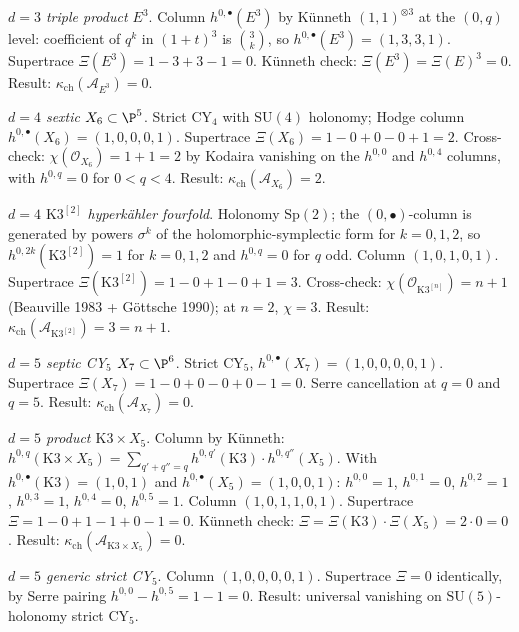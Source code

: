 \emph{$d = 3$ triple product $E^3$}. Column $h^{0, \bullet}(E^3)$ by
K\"unneth $(1, 1)^{\otimes 3}$ at the $(0, q)$ level: coefficient of
$q^k$ in $(1 + t)^3$ is $\binom{3}{k}$, so
$h^{0, \bullet}(E^3) = (1, 3, 3, 1)$. Supertrace $\Xi(E^3) = 1 - 3
+ 3 - 1 = 0$. K\"unneth check: $\Xi(E^3) = \Xi(E)^3 = 0$. Result:
$\kappa_{\mathrm{ch}}(\mathcal{A}_{E^3}) = 0$.

\emph{$d = 4$ sextic $X_6 \subset \P^5$}. Strict CY$_4$ with
$\mathrm{SU}(4)$ holonomy; Hodge column
$h^{0, \bullet}(X_6) = (1, 0, 0, 0, 1)$. Supertrace
$\Xi(X_6) = 1 - 0 + 0 - 0 + 1 = 2$. Cross-check:
$\chi(\mathcal{O}_{X_6}) = 1 + 1 = 2$ by Kodaira vanishing on the
$h^{0, 0}$ and $h^{0, 4}$ columns, with $h^{0, q} = 0$ for
$0 < q < 4$. Result: $\kappa_{\mathrm{ch}}(\mathcal{A}_{X_6}) = 2$.

\emph{$d = 4$ $\mathrm{K3}^{[2]}$ hyperk\"ahler fourfold}. Holonomy
$\mathrm{Sp}(2)$; the $(0, \bullet)$-column is generated by powers
$\sigma^k$ of the holomorphic-symplectic form for $k = 0, 1, 2$, so
$h^{0, 2k}(\mathrm{K3}^{[2]}) = 1$ for $k = 0, 1, 2$ and
$h^{0, q} = 0$ for $q$ odd. Column $(1, 0, 1, 0, 1)$. Supertrace
$\Xi(\mathrm{K3}^{[2]}) = 1 - 0 + 1 - 0 + 1 = 3$. Cross-check:
$\chi(\mathcal{O}_{\mathrm{K3}^{[n]}}) = n + 1$ (Beauville 1983 +
G\"ottsche 1990); at $n = 2$, $\chi = 3$. Result:
$\kappa_{\mathrm{ch}}(\mathcal{A}_{\mathrm{K3}^{[2]}}) = 3 = n + 1$.

\emph{$d = 5$ septic CY$_5$ $X_7 \subset \P^6$}. Strict CY$_5$,
$h^{0, \bullet}(X_7) = (1, 0, 0, 0, 0, 1)$. Supertrace
$\Xi(X_7) = 1 - 0 + 0 - 0 + 0 - 1 = 0$. Serre cancellation at
$q = 0$ and $q = 5$. Result:
$\kappa_{\mathrm{ch}}(\mathcal{A}_{X_7}) = 0$.

\emph{$d = 5$ product $\mathrm{K3} \times X_5$}. Column by
K\"unneth: $h^{0, q}(\mathrm{K3} \times X_5) = \sum_{q' + q'' = q}
h^{0, q'}(\mathrm{K3}) \cdot h^{0, q''}(X_5)$. With
$h^{0, \bullet}(\mathrm{K3}) = (1, 0, 1)$ and
$h^{0, \bullet}(X_5) = (1, 0, 0, 1)$:
$h^{0, 0} = 1$, $h^{0, 1} = 0$, $h^{0, 2} = 1$,
$h^{0, 3} = 1$, $h^{0, 4} = 0$, $h^{0, 5} = 1$. Column
$(1, 0, 1, 1, 0, 1)$. Supertrace $\Xi = 1 - 0 + 1 - 1 + 0 - 1 = 0$.
K\"unneth check: $\Xi = \Xi(\mathrm{K3}) \cdot \Xi(X_5) = 2 \cdot 0
= 0$. Result:
$\kappa_{\mathrm{ch}}(\mathcal{A}_{\mathrm{K3} \times X_5}) = 0$.

\emph{$d = 5$ generic strict CY$_5$}. Column $(1, 0, 0, 0, 0, 1)$.
Supertrace $\Xi = 0$ identically, by Serre pairing $h^{0, 0} -
h^{0, 5} = 1 - 1 = 0$. Result: universal vanishing on
$\mathrm{SU}(5)$-holonomy strict CY$_5$.

